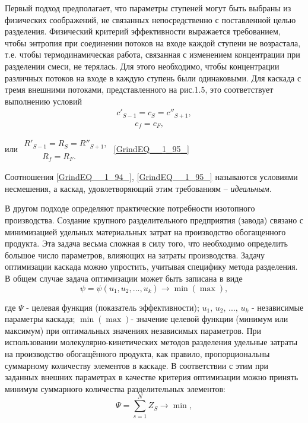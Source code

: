 Первый подход предполагает, что параметры ступеней могут быть выбраны из физических соображений, не связанных непосредственно с поставленной целью разделения. Физический критерий эффективности выражается требованием, чтобы энтропия при соединении потоков на входе каждой ступени не возрастала, т.е. чтобы термодинамическая работа, связанная с изменением концентрации при разделении смеси, не терялась. Для этого необходимо, чтобы концентрации различных потоков на входе в каждую ступень были одинаковыми. Для каскада с тремя внешними потоками, представленного на рис.1.5, это соответствует выполнению условий
\begin{equation} \label{GrindEQ__1_94_} 
\begin{array}{l} {c'_{S-1} =c_{S} =c''_{S+1} ,} \\ {\; \; \; \; \; \; \; \; c_{f} =c_{F} ,} \end{array} 
\end{equation} 

или $\begin{array}{l} {R'_{S-1} =R_{S} =R''_{S+1} ,} \\ {\; \; \; \; \; \; \; \; R_{f} =R_{F} .} \end{array}$                                       \ref{GrindEQ__1_95_}

Соотношения \ref{GrindEQ__1_94_}, \ref{GrindEQ__1_95_} называются условиями несмешения, а каскад, удовлетворяющий этим требованиям -- \textit{идеальным}. 

В другом подходе определяют практические потребности изотопного производства. Создание крупного разделительного предприятия (завода) связано с минимизацией удельных материальных затрат на производство обогащенного продукта. Эта задача весьма сложная в силу того, что необходимо определить большое число параметров, влияющих на затраты производства. Задачу оптимизации каскада можно упростить, учитывая специфику метода разделения. В общем случае задача оптимизации может быть записана в виде
\begin{equation} \label{GrindEQ__1_96_} 
\psi =\psi (u_{1} ,u_{2} ,...,u_{k} )\to \min (\max ), 
\end{equation} 

где $\Psi $ - целевая функция (показатель эффективности); $u_{1} ,\, u_{2} ,\, ...,\, u_{k} $ - независимые параметры каскада; $\min (\max )$- значение целевой функции (минимум или максимум) при оптимальных значениях независимых параметров. При использовании молекулярно-кинетических методов разделения удельные затраты на производство обогащённого продукта, как правило, пропорциональны суммарному количеству элементов в каскаде. В соответствии с этим при заданных внешних параметрах в качестве критерия оптимизации можно принять минимум суммарного количества разделительных элементов:
\begin{equation} \label{GrindEQ__1_97_} 
\Psi =\sum _{s=1}^{N}Z_{S}  \to \min , 
\end{equation} 

